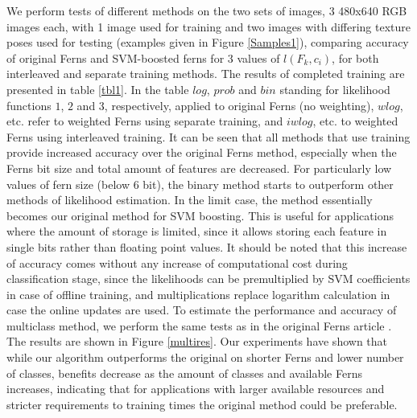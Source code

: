 We perform tests of different methods on the two sets of images, 3 480x640 RGB images each, with 1 image used for training and two images with differing texture poses used for testing (examples given in Figure \ref{Samples1}), comparing accuracy of original Ferns and SVM-boosted ferns for 3 values of $l(F_k,c_i)$, for both interleaved and separate training methods. The results of completed training are presented in table \ref{tbl1}. In the table $log$, $prob$ and $bin$ standing for likelihood functions $1$, $2$ and $3$, respectively, applied to original Ferns (no weighting), $wlog$, etc. refer to weighted Ferns using separate training, and $iwlog$, etc. to weighted Ferns using interleaved training.  It can be seen that all methods that use training provide increased accuracy over the original Ferns method, especially when the Ferns bit size and total amount of features are decreased. For particularly low values of fern size (below 6 bit), the binary method starts to outperform other methods of likelihood estimation. In the limit case, the method essentially becomes our original method for SVM boosting. This is useful for applications where the amount of storage is limited, since it allows storing each feature in single bits rather than floating point values. It should be noted that this increase of accuracy comes without any increase of computational cost during classification stage, since the likelihoods can be premultiplied by SVM coefficients in case of offline training, and multiplications replace logarithm calculation in case the online updates are used. 
To estimate the performance and accuracy of multiclass method, we perform the same tests as in the original Ferns article \cite{Ferns1}. The results are shown in Figure \ref{multires}. Our experiments have shown that while our algorithm outperforms the original on shorter Ferns and lower number of classes, benefits decrease as the amount of classes and available Ferns increases, indicating that for applications with larger available resources and stricter requirements to training times the original method could be preferable.

